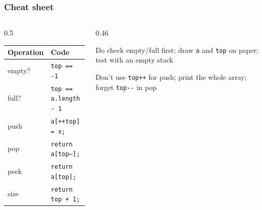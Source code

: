 \documentclass[aspectratio=169,10pt,compress]{beamer}
\begin{document}




\begin{frame}[t,fragile] \frametitle{Cheat sheet}
  \begin{columns}[T]
    \begin{column}{0.5\textwidth}
      \begin{center}\small
      \begin{tabular}{ll}
        \toprule
        \textbf{Operation} & \textbf{Code} \\
        \midrule
        empty?   & \texttt{top == -1} \\
        full?    & \texttt{top == a.length - 1} \\
        push     & \texttt{a[++top] = x;} \\
        pop      & \texttt{return a[top--];} \\
        peek     & \texttt{return a[top];} \\
        size     & \texttt{return top + 1;} \\
        \bottomrule
      \end{tabular}
      \end{center}
    \end{column}
    \begin{column}{0.46\textwidth}
      \begin{block}{Do}
        \small check empty/full first; draw \texttt{a} and \texttt{top} on paper; test with an empty stack
      \end{block}
      \begin{block}{Don't}
        \small use \texttt{top++} for push; print the whole array; forget \texttt{top-{}-} in pop
      \end{block}
    \end{column}
  \end{columns}
\end{frame}
\end{document}
